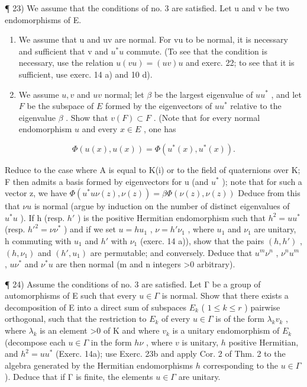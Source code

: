 ¶ 23) We assume that the conditions of no. 3 are satisfied. Let u and v be two endomorphisms of E.

\begin{enumerate}
\def\labelenumi{\alph{enumi})}
\item
  We assume that u and uv are normal. For vu to be normal, it is necessary and sufficient that v and \(u^{*}u\) commute. (To see that the condition is necessary, use the relation \(u(vu) = (uv)u\) and exerc. 22; to see that it is sufficient, use exerc. 14 a) and 10 d).
\item
  We assume \(u, v\) and \(uv\) normal; let \(\beta\) be the largest eigenvalue of \(uu^*\) , and let \(F\) be the subspace of \(E\) formed by the eigenvectors of \(uu^*\) relative to the eigenvalue \(\beta\) . Show that \(v(F) \subset F\) . (Note that for every normal endomorphism \(u\) and every \(x \in E\) , one has
\end{enumerate}

\[
\Phi (u (x), u (x)) = \Phi (u ^ {*} (x), u ^ {*} (x)).
\]

Reduce to the case where A is equal to K(i) or to the field of quaternions over K; F then admits a basis formed by eigenvectors for u (and \(u^{*}\) ); note that for such a vector z, we have \(\Phi(u^{*}u\nu(z),\nu(z))=\beta\Phi(\nu(z),\nu(z))\) Deduce from this that \(\nu u\) is normal (argue by induction on the number of distinct eigenvalues of \(u^{*}u\) ). If h (resp. \(h'\) ) is the positive Hermitian endomorphism such that \(h^{2}=uu^{*}\) (resp. \(h'^{2}=\nu\nu^{*}\) ) and if we set \(u=hu_{1}\) , \(\nu=h'\nu_{1}\) , where \(u_{1}\) and \(\nu_{1}\) are unitary, h commuting with \(u_{1}\) and \(h'\) with \(\nu_{1}\) (exerc. 14 a)), show that the pairs \((h,h')\) , \((h,\nu_{1})\) and \((h',u_{1})\) are permutable; and conversely. Deduce that \(u^{m}\nu^{n}\) , \(\nu^{n}u^{m}\) , \(u\nu^{*}\) and \(\nu^{*}u\) are then normal (m and n integers \textgreater0 arbitrary).

¶ 24) Assume the conditions of no. 3 are satisfied. Let Γ be a group of automorphisms of E such that every \(u \in \Gamma\) is normal. Show that there exists a decomposition of E into a direct sum of subspaces \(E_k\) ( \(1 \leqslant k \leqslant r\) ) pairwise orthogonal, such that the restriction to \(E_k\) of every \(u \in \Gamma\) is of the form \(\lambda_k v_k\) , where \(\lambda_k\) is an element \textgreater0 of K and where \(v_k\) is a unitary endomorphism of \(E_k\) (decompose each \(u \in \Gamma\) in the form \(h\nu\) , where \(v\) is unitary, \(h\) positive Hermitian, and \(h^2 = uu^*\) (Exerc. 14a); use Exerc. 23b and apply Cor. 2 of Thm. 2 to the algebra generated by the Hermitian endomorphisms \(h\) corresponding to the \(u \in \Gamma\) ). Deduce that if Γ is finite, the elements \(u \in \Gamma\) are unitary.


